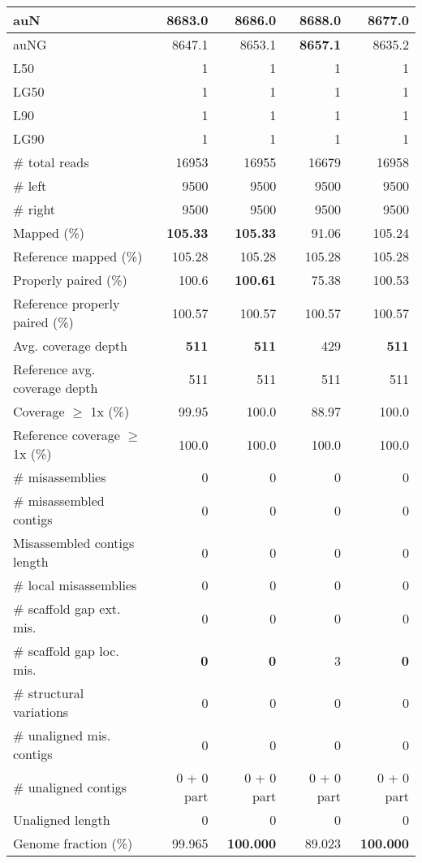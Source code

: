\documentclass[12pt,a4paper]{article}
\begin{document}
\begin{table}[ht]
\begin{center}
\begin{tabular}{|l*{4}{|r}|}
auN & 8683.0 & 8686.0 & {\bf 8688.0} & 8677.0 \\ \hline
auNG & 8647.1 & 8653.1 & {\bf 8657.1} & 8635.2 \\ \hline
L50 & 1 & 1 & 1 & 1 \\ \hline
LG50 & 1 & 1 & 1 & 1 \\ \hline
L90 & 1 & 1 & 1 & 1 \\ \hline
LG90 & 1 & 1 & 1 & 1 \\ \hline
\# total reads & 16953 & 16955 & 16679 & 16958 \\ \hline
\# left & 9500 & 9500 & 9500 & 9500 \\ \hline
\# right & 9500 & 9500 & 9500 & 9500 \\ \hline
Mapped (\%) & {\bf 105.33} & {\bf 105.33} & 91.06 & 105.24 \\ \hline
Reference mapped (\%) & 105.28 & 105.28 & 105.28 & 105.28 \\ \hline
Properly paired (\%) & 100.6 & {\bf 100.61} & 75.38 & 100.53 \\ \hline
Reference properly paired (\%) & 100.57 & 100.57 & 100.57 & 100.57 \\ \hline
Avg. coverage depth & {\bf 511} & {\bf 511} & 429 & {\bf 511} \\ \hline
Reference avg. coverage depth & 511 & 511 & 511 & 511 \\ \hline
Coverage $\geq$ 1x (\%) & 99.95 & 100.0 & 88.97 & 100.0 \\ \hline
Reference coverage $\geq$ 1x (\%) & 100.0 & 100.0 & 100.0 & 100.0 \\ \hline
\# misassemblies & 0 & 0 & 0 & 0 \\ \hline
\# misassembled contigs & 0 & 0 & 0 & 0 \\ \hline
Misassembled contigs length & 0 & 0 & 0 & 0 \\ \hline
\# local misassemblies & 0 & 0 & 0 & 0 \\ \hline
\# scaffold gap ext. mis. & 0 & 0 & 0 & 0 \\ \hline
\# scaffold gap loc. mis. & {\bf 0} & {\bf 0} & 3 & {\bf 0} \\ \hline
\# structural variations & 0 & 0 & 0 & 0 \\ \hline
\# unaligned mis. contigs & 0 & 0 & 0 & 0 \\ \hline
\# unaligned contigs & 0 + 0 part & 0 + 0 part & 0 + 0 part & 0 + 0 part \\ \hline
Unaligned length & 0 & 0 & 0 & 0 \\ \hline
Genome fraction (\%) & 99.965 & {\bf 100.000} & 89.023 & {\bf 100.000} \\ \hline

\end{tabular}
\end{center}
\end{table}
\end{document}
